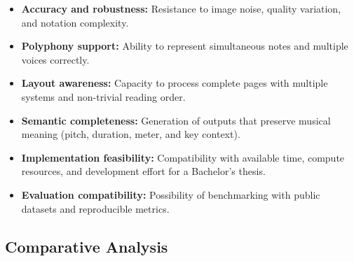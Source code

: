 \documentclass[11pt, a4paper]{article}
\begin{document}
\begin{itemize}
    \item \textbf{Accuracy and robustness:} Resistance to image noise, quality variation, and notation complexity.
    \item \textbf{Polyphony support:} Ability to represent simultaneous notes and multiple voices correctly.
    \item \textbf{Layout awareness:} Capacity to process complete pages with multiple systems and non-trivial reading order.
    \item \textbf{Semantic completeness:} Generation of outputs that preserve musical meaning (pitch, duration, meter, and key context).
    \item \textbf{Implementation feasibility:} Compatibility with available time, compute resources, and development effort for a Bachelor's thesis.
    \item \textbf{Evaluation compatibility:} Possibility of benchmarking with public datasets and reproducible metrics.
\end{itemize}

\subsection{Comparative Analysis}
\end{document}
